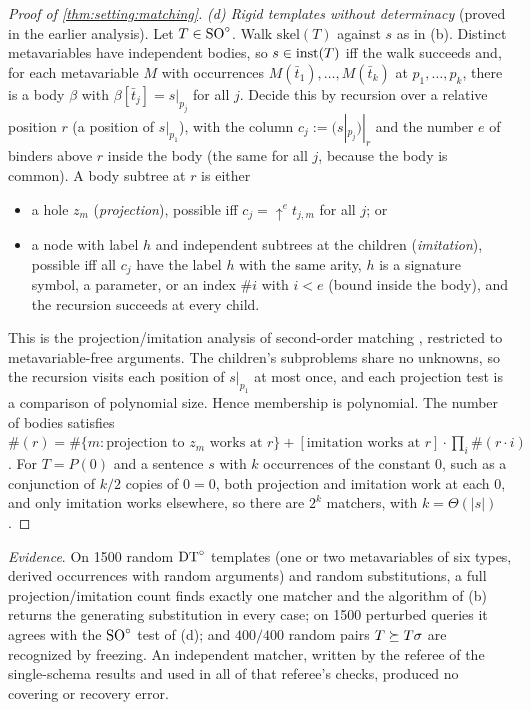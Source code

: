 \begin{proof}[Proof of \cref{thm:setting:matching}]
\emph{(d) Rigid templates without determinacy} (proved in the earlier analysis). Let $T\in\mathrm{SO}^{\circ}$. Walk $\mathrm{skel}(T)$ against $s$ as in (b). Distinct metavariables have independent bodies, so $s\in\mathrm{inst}(T)$ iff the walk succeeds and, for each metavariable $M$ with occurrences $M(\bar t_1),\dots,M(\bar t_k)$ at $p_1,\dots,p_k$, there is a body $\beta$ with $\beta[\bar t_j]=s|_{p_j}$ for all $j$. Decide this by recursion over a relative position $r$ (a position of $s|_{p_1}$), with the column $c_j:=(s|_{p_j})|_r$ and the number $e$ of binders above $r$ inside the body (the same for all $j$, because the body is common). A body subtree at $r$ is either
\begin{itemize}
\item a hole $z_m$ (\emph{projection}), possible iff $c_j=\uparrow^e t_{j,m}$ for all $j$; or
\item a node with label $h$ and independent subtrees at the children (\emph{imitation}), possible iff all $c_j$ have the label $h$ with the same arity, $h$ is a signature symbol, a parameter, or an index $\#i$ with $i<e$ (bound inside the body), and the recursion succeeds at every child.
\end{itemize}
This is the projection/imitation analysis of second-order matching \citep{huet1978proving}, restricted to metavariable-free arguments. The children's subproblems share no unknowns, so the recursion visits each position of $s|_{p_1}$ at most once, and each projection test is a comparison of polynomial size. Hence membership is polynomial. The number of bodies satisfies $\#(r)=\#\{m:\text{projection to }z_m\text{ works at }r\}+[\text{imitation works at }r]\cdot\prod_i\#(r\cdot i)$. For $T=P(0)$ and a sentence $s$ with $k$ occurrences of the constant $0$, such as a conjunction of $k/2$ copies of $0=0$, both projection and imitation work at each $0$, and only imitation works elsewhere, so there are $2^k$ matchers, with $k=\Theta(|s|)$.
\end{proof}

\emph{Evidence}. On 1500 random $\mathrm{DT}^{\circ}$ templates (one or two metavariables of six types, derived occurrences with random arguments) and random substitutions, a full projection/imitation count finds exactly one matcher and the algorithm of (b) returns the generating substitution in every case; on 1500 perturbed queries it agrees with the $\mathrm{SO}^{\circ}$ test of (d); and $400/400$ random pairs $T\succeq T\sigma$ are recognized by freezing. An independent matcher, written by the referee of the single-schema results and used in all of that referee's checks, produced no covering or recovery error.

